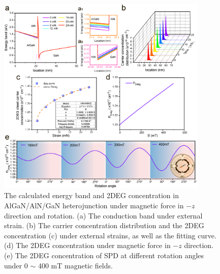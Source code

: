 \begin{figure}[H] 
\centering    
\includegraphics[width=0.9\textwidth]{ch4_8}
\caption[The calculated energy band and 2DEG concentration in AlGaN/AlN/GaN heterojunction under magnetic force in $-z$ direction and rotation.]{The calculated energy band and 2DEG concentration in AlGaN/AlN/GaN heterojunction under magnetic force in $-z$ direction and rotation. (a) The conduction band under external strain. (b) The carrier concentration distribution and the 2DEG concentration (c) under external strains, as well as the fitting curve. (d) The 2DEG concentration under magnetic force in $-z$ direction. (e) The 2DEG concentration of SPD at different rotation angles under 0 $\sim$ 400 \unit{\milli\tesla} magnetic fields.}
\label{fig:4.8}
\end{figure}



